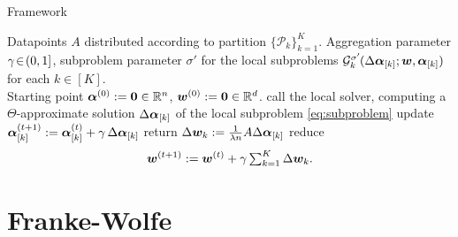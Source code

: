 \begin{algorithm}[h]
\caption{\cocoap Framework}
\label{alg:cocoa}

\begin{algorithmic}[1]
 Datapoints $A$ distributed according to partition $\{\mathcal{P}_k\}_{k=1}^K$.
Aggregation parameter $\gamma\!\in\!(0,1]$, 
subproblem parameter $\sigma'$ for the local subproblems
$\mathcal{G}^{\sigma'}_k\hspace{-0.08em}(  \Delta \bm{\alpha}_{[k]}; {\bm{w}}, \bm{\alpha}_{[k]})$ for each $k\in[K]$.\\
Starting point $\bm{\alpha}^{(0)} := \mathbf{0} \in \mathbb{R}^n$, ${\bm{w}}^{(0)}:=\mathbf{0}\in \mathbb{R}^d$.
     \STATE call the local solver, computing
     a $\Theta$-approximate solution 
     $\Delta \bm{\alpha}_{[k]}$   
        of  the local subproblem \eqref{eq:subproblem} 
     \STATE update $\bm{\alpha}^{(t+1)}_{[k]} := \bm{\alpha}^{(t)}_{[k]} + \gamma \, \Delta \bm{\alpha}_{[k]}$
     \STATE return $\Delta {\bm{w}}_k :=\frac1{\lambda n} A \Delta \bm{\alpha}_{[k]}$ %
  \ENDFOR
  \STATE reduce\vspace{-6mm}
\begin{equation}\label{eq:primalGlobalUpdate}\vspace{-1mm}
\vc{\wv}{t+1}  := \vc{\wv}{t} +
  \aggpar \textstyle \sum_{k=1}^K \Delta \wv_k.
\end{equation}
\ENDFOR 
\end{algorithmic}
\end{algorithm}

\section{Franke-Wolfe}

